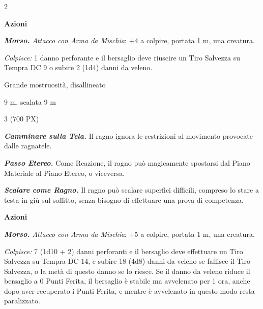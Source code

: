 \begin{multicols}{2}
{\textbf{Azioni}

\emph{\textbf{Morso.} Attacco con Arma da Mischia}: +4 a colpire, portata 1 m, una creatura.

\emph{Colpisce:} 1 danno perforante e il bersaglio deve riuscire un Tiro Salvezza su Tempra DC 9 o subire 2 (1d4) danni da veleno.

\begin{description}[noitemsep, topsep=0pt, parsep=0pt, partopsep=0pt, itemsep=1pt, leftmargin=2.35cm,  labelwidth=2.2cm, itemindent=0cm, listparindent=0pt] %
\setlength{\baselineskip}{10pt}
\item[\textbf{Taglia/Tipo}] Grande mostruosità, disallineato
\item[\textbf{Caratt.}] 
\item[\textbf{Punti Ferita}] 
\item[\textbf{Tiri Salvez.}] 
\item[\textbf{Movimento}] 9 m, scalata 9 m
\item[\textbf{Sfida}] 3 (700 PX)
\end{description}
\smallskip

\emph{\textbf{Camminare sulla Tela.}} Il ragno ignora le restrizioni al movimento provocate dalle ragnatele.

\emph{\textbf{Passo Etereo.}} Come Reazione, il ragno può magicamente spostarsi dal Piano Materiale al Piano Etereo, o viceversa.

\emph{\textbf{Scalare come Ragno.}} Il ragno può scalare superfici difficili, compreso lo stare a testa in giù sul soffitto, senza bisogno di effettuare una prova di competenza.

\textbf{Azioni}

\emph{\textbf{Morso.} Attacco con Arma da Mischia}: +5 a colpire, portata 1 m, una creatura.

\emph{Colpisce:} 7 (1d10 + 2) danni perforanti e il bersaglio deve effettuare un Tiro Salvezza su Tempra DC 14, e subire 18 (4d8) danni da veleno se fallisce il Tiro Salvezza, o la metà di questo danno se lo riesce. Se il danno da veleno riduce il bersaglio a 0 Punti Ferita, il bersaglio è stabile ma avvelenato per 1 ora, anche dopo aver recuperato i Punti Ferita, e mentre è avvelenato in questo modo resta paralizzato.

}
\end{multicols}
